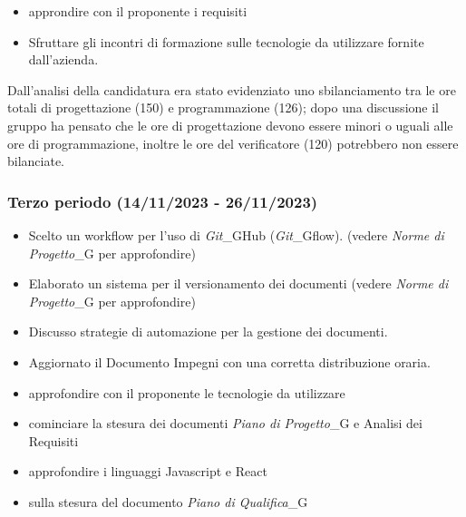 \begin{itemize}
    \item approndire con il proponente i requisiti
    \item Sfruttare gli incontri di formazione sulle tecnologie da utilizzare fornite
dall’azienda.
\end{itemize}

Dall'analisi della candidatura era stato evidenziato uno sbilanciamento tra le ore totali di progettazione (150)
e programmazione (126); dopo una discussione il gruppo ha pensato che le ore di
progettazione devono essere minori o uguali alle ore di programmazione, inoltre le
ore del verificatore (120) potrebbero non essere bilanciate.


\subsubsection{Terzo periodo (14/11/2023 - 26/11/2023)}

\begin{itemize}
    \item Scelto un workflow per l'uso di \textit{Git}_GHub (\textit{Git}_Gflow). (vedere \textit{Norme di Progetto}_G per approfondire)
    \item Elaborato un sistema per il versionamento dei documenti (vedere \textit{Norme di Progetto}_G per approfondire)
    \item Discusso strategie di automazione per la gestione dei documenti.
    \item Aggiornato il Documento Impegni con una corretta distribuzione oraria.
\end{itemize}

\begin{itemize}
    \item approfondire con il proponente le tecnologie da utilizzare
    \item cominciare la stesura dei documenti \textit{Piano di Progetto}_G e Analisi dei Requisiti
    \item approfondire i linguaggi Javascript e React
\end{itemize}

\begin{itemize}
    \item sulla stesura del documento \textit{Piano di Qualifica}_G
\end{itemize}

